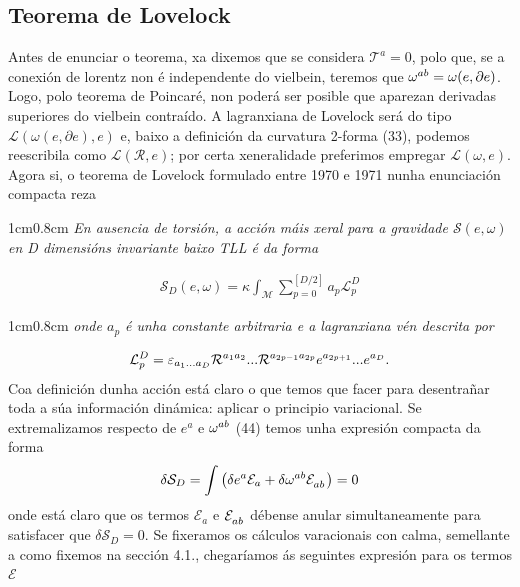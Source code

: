 \subsection{Teorema de Lovelock}
Antes de enunciar o teorema, xa dixemos que se considera $\mathcal{T}^a=0$, polo que, se a conexión de lorentz non é independente do vielbein, teremos que $\omega\indices{^a^b}=\omega(e,\partial e)$. Logo, polo teorema de Poincaré, non poderá ser posible que aparezan derivadas superiores do vielbein contraído. A lagranxiana de Lovelock será do tipo $\mathcal{L}(\omega(e,\partial e),e)$ e, baixo a definición da curvatura 2-forma (33), podemos reescribila como $\mathcal{L}(\mathcal{R},e)$; por certa xeneralidade preferimos empregar $\mathcal{L}(\omega,e)$. Agora si, o teorema de Lovelock formulado entre 1970 e 1971 \cite{Lovelock-1970,Lovelock-1971} nunha enunciación compacta reza
\begin{adjustwidth}{1cm}{0.8cm}\vspace{0.4em}
    \textit{En ausencia de torsión, a acción máis xeral para a gravidade $\mathcal{S}(e,\omega)$ en D dimensións invariante baixo TLL é da forma}
\end{adjustwidth}
\begin{align}
    \mathcal{S}_D(e,\omega) = \kappa\int_\mathcal{M}\sum_{p=0}^{[D/2]}a_p\mathcal{L}_p^D
\end{align}
\begin{adjustwidth}{1cm}{0.8cm}
    \textit{onde $a_p$ é unha constante arbitraria e a lagranxiana vén descrita por}
\end{adjustwidth}
\begin{align}
    \mathcal{L}_p^D = \varepsilon_{a_1...a_D}\mathcal{R}\indices{^{a_1}^{a_2}}...\mathcal{R}\indices{^{a_{2p-1}}^{a_{2p}}}e\indices{^{a_{2p+1}}}...e\indices{^{a_D}}.
\end{align}
Coa definición dunha acción está claro o que temos que facer para desentrañar toda a súa información dinámica: aplicar o principio variacional. Se extremalizamos respecto de $e^a$ e $\omega\indices{^a^b}$ (44) temos unha expresión compacta da forma
\begin{align}
    \delta\mathcal{S}_D = \int\left(\delta e^a\mathcal{E}_a + \delta\omega\indices{^a^b}\mathcal{E}\indices{_a_b} \right) = 0
\end{align}
onde está claro que os termos $\mathcal{E}_a$ e 
$\mathcal{E}\indices{_a_b}$ débense anular simultaneamente para satisfacer que $\delta\mathcal{S}_D = 0$. Se fixeramos os cálculos varacionais con calma, semellante a como fixemos na sección 4.1., chegaríamos ás seguintes expresión para os termos $\mathcal{E}$
